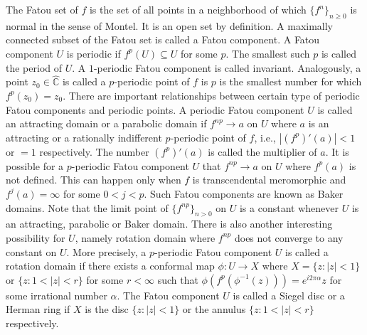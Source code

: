 \documentclass[12pt]{article}
\begin{document}
The Fatou set of $f$ is the set of all points in a neighborhood of which $\{f^n\}_{n\geq0}$ is normal in the sense of Montel.
It is an open set by definition. A maximally connected subset of the Fatou set is called a Fatou component. A Fatou component $U$ is periodic if $f^p (U) \subseteq U$ for some $p$. The smallest such $p$ is called the period of $U$. A   $1$-periodic Fatou component is called invariant. Analogously, a point  $z_0 \in \widehat{\mathbb{C}}$ is called a $p$-periodic point of $f$ is $p$ is the smallest number for which $f^p (z_0)=z_0$. There are important relationships between certain type of periodic Fatou components and periodic points.  A periodic Fatou component $U$ is called an attracting domain or a parabolic domain if $f^{np} \to a$ on $U$ where $a$ is an attracting  or a rationally indifferent $p$-periodic point of $f$, i.e., $|(f^p)' (a)|<1$ or $=1$  respectively. The number $(f^p)' (a)$ is called the multiplier of $a$.  It is possible for a $p$-periodic Fatou component $U$ that $f^{np} \to a$ on $U$ where $f^p (a)$ is not defined. This can happen only when $f$ is transcendental meromorphic and $f^j(a)=\infty$ for some $0<j<p$. Such Fatou components are known as Baker domains. Note that the limit point  of $\{f^{np}\}_{n>0}$ on $U$ is  a constant whenever $U$ is an attracting, parabolic or Baker domain.  There is also another interesting possibility for $U$, namely rotation domain  where $f^{np}$ does not converge to any constant on $U$. More precisely, a $p$-periodic Fatou component $U$ is called a rotation domain if there exists a conformal map $\phi : U \rightarrow  X$ where $X=\{z: |z|<1\}$ or $\{z:1<|z|<r\}$ for some $r <\infty$ such that  $\phi(f^p(\phi^{-1}(z)))=e^{i 2 \pi \alpha}z$ for some irrational number $\alpha$.
The Fatou component $U$ is called a Siegel disc or a Herman ring if $X$ is the disc $\{z: |z|<1\}$ or the annulus $\{z:1<|z|<r\}$  respectively. 
\end{document}
